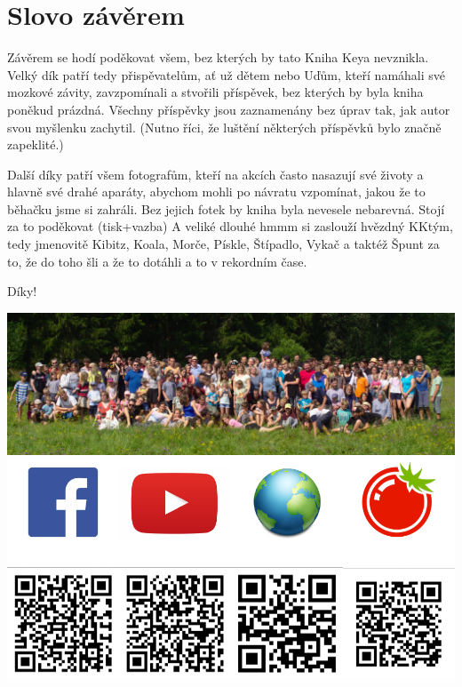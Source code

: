 \clearpage

\chapter{Slovo závěrem} %
\label{cha:slovo_závěrem}

Závěrem se hodí poděkovat všem, bez kterých by tato Kniha Keya nevznikla. Velký dík patří tedy přispěvatelům, ať už dětem nebo Uďům, kteří namáhali své mozkové závity, zavzpomínali a stvořili příspěvek, bez kterých by byla kniha poněkud prázdná. Všechny příspěvky jsou zaznamenány bez úprav tak, jak autor svou myšlenku zachytil. (Nutno říci, že luštění některých příspěvků bylo značně zapeklité.)

Další díky patří všem fotografům, kteří na akcích často nasazují své životy a hlavně své drahé aparáty, abychom mohli po návratu vzpomínat, jakou že to běhačku jsme si zahráli. Bez jejich fotek by kniha byla nevesele nebarevná.
Stojí za to poděkovat (tisk+vazba)
A veliké dlouhé hmmm si zaslouží hvězdný KKtým, tedy jmenovitě Kibitz, Koala, Morče, Pískle, Štípadlo, Vykač a taktéž Špunt za to, že do toho šli a že to dotáhli a to v rekordním čase.

Díky!


\begin{center}
\includegraphics[width=\textwidth]{img/vsichni.jpg}
\includegraphics[width=\textwidth]{img/QR/komplet.pdf}
\end{center}

